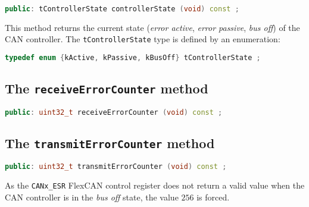 \documentclass[9pt, a4paper, obeyspaces, openany]{extarticle}
\begin{document}
{ \small\begin{lstlisting}[language=c++]
public: tControllerState controllerState (void) const ;
\end{lstlisting}}

This method returns the current state (\emph{error active}, \emph{error passive}, \emph{bus off}) of the CAN controller. The \texttt{tControllerState} type is defined by an enumeration:
{ \small\begin{lstlisting}[language=c++]
typedef enum {kActive, kPassive, kBusOff} tControllerState ;
\end{lstlisting}}


\subsection{The \texttt{receiveErrorCounter} method}

{ \small\begin{lstlisting}[language=c++]
public: uint32_t receiveErrorCounter (void) const ;
\end{lstlisting}}



\subsection{The \texttt{transmitErrorCounter} method}

{ \small\begin{lstlisting}[language=c++]
public: uint32_t transmitErrorCounter (void) const ;
\end{lstlisting}}

As the \texttt{CANx\_ESR} FlexCAN control register does not return a valid value when the CAN controller is in the \emph{bus off} state, the value $256$ is forced.


\end{document}
